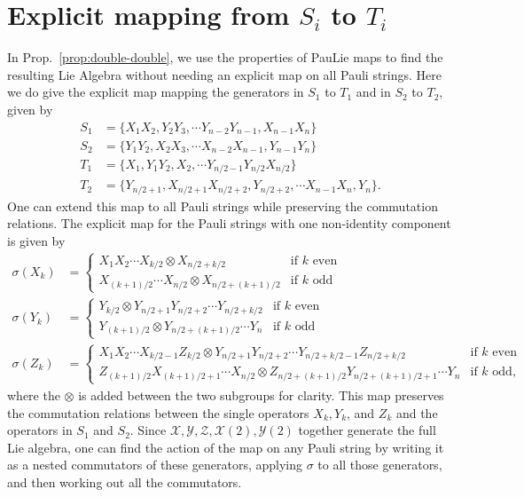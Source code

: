 \documentclass[12pt, a4-paper]{amsart}
\newcommand{\cX}{\mathcal{X}}
\newcommand{\cY}{\mathcal{Y}}
\newcommand{\cZ}{\mathcal{Z}}
\numberwithin{equation}{section}
\begin{document}
\section{Explicit mapping from \texorpdfstring{$S_i$}{S} to \texorpdfstring{$T_i$}{T}}\label{app:explicit_map_S_T}
In Prop.~\ref{prop:double-double}, we use the properties of PauLie maps to find the resulting Lie Algebra without needing an explicit map on all Pauli strings. Here we do give the explicit map mapping the generators in $S_1$ to $T_1$ and in $S_2$ to $T_2$, given by
\begin{equation}
\begin{aligned}
    S_1 &= \{X_1 X_2, Y_2 Y_3, \cdots Y_{n-2}Y_{n-1},  X_{n-1} X_n\} \\
    S_2 &= \{Y_1 Y_2, X_2 X_3, \cdots X_{n-2}X_{n-1},  Y_{n-1} Y_n\} \\
    T_1 &= \{X_1, Y_1 Y_2, X_2, \cdots Y_{n/2-1} Y_{n/2} X_{n/2} \} \\
    T_2 &= \{Y_{n/2+1}, X_{n/2+1}X_{n/2+2}, Y_{n/2+2}, \cdots  X_{n-1} X_n, Y_n \}.
\end{aligned}
\end{equation}
One can extend this map to all Pauli strings while preserving the commutation relations. The explicit map for the Pauli strings with one non-identity component is given by
\begin{equation}
\begin{aligned}
    \sigma(X_k) &= \begin{cases}
        X_1 X_2 \cdots X_{k/2} \otimes X_{n/2 + k/2} & \text{if $k$ even} \\
        X_{(k+1)/2}\cdots X_{n/2} \otimes X_{n/2 + (k+1)/2} & \text{if $k$ odd}
    \end{cases}\\
    \sigma(Y_k) &= \begin{cases}
        Y_{k/2} \otimes Y_{n/2+1} Y_{n/2+2} \cdots Y_{n/2+ k/2} & \text{if $k$ even} \\
        Y_{(k+1)/2} \otimes Y_{n/2+ (k+1)/2} \cdots Y_{n} & \text{if $k$ odd}
    \end{cases} \\
    \sigma(Z_k) &= \begin{cases}
        X_1 X_2 \cdots X_{k/2-1} Z_{k/2}  \otimes Y_{n/2+1} Y_{n/2+2} \cdots Y_{n/2+ k/2-1} Z_{n/2+k/2} & \text{if $k$ even} \\
        Z_{(k+1)/2} X_{(k+1)/2+1}\cdots X_{n/2} \otimes Z_{n/2+(k+1)/2} Y_{n/2+ (k+1)/2+1} \cdots Y_{n} & \text{if $k$ odd},
    \end{cases} 
\end{aligned}
\end{equation}
where the $\otimes$ is added between the two subgroups for clarity.
This map preserves the commutation relations between the single operators $X_k, Y_k$, and $Z_k$ and the operators in $S_1$ and $S_2$. Since $\cX, \cY, \cZ, \cX(2),\cY(2)$ together generate the full Lie algebra, one can find the action of the map on any Pauli string by writing it as a nested commutators of these generators, applying $\sigma$ to all those generators, and then working out all the commutators.
\end{document}
